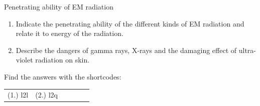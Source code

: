         \label{m38779*uid27}
            \begin{exercises}{Penetrating ability of EM radiation}
            \nopagebreak
        \label{m38779*id189729}\begin{enumerate}[noitemsep, label=\textbf{\arabic*}. ] 
            \label{m38779*uid28}\item Indicate the penetrating ability of the different kinds of EM radiation and relate it to energy of the radiation.\newline
\label{m38779*uid29}\item Describe the dangers of gamma rays, X-rays and the damaging effect of ultra-violet radiation on skin.\newline
\end{enumerate}
    \label{m38779*cid8}
\par {} Find the answers with the shortcodes:
 \par \begin{tabular}[h]{cccccc}
 (1.) l2l  &  (2.) l2q  &  \end{tabular}
\end{exercises}


